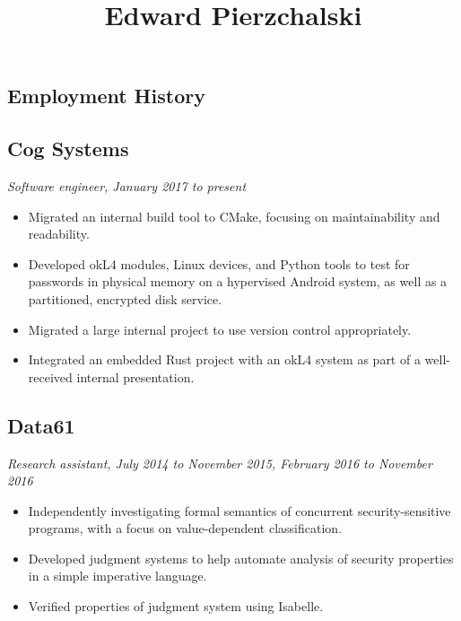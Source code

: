 \documentclass{article}
\title{Edward Pierzchalski}
\date{}
\begin{document}
\maketitle
\vspace{-5em}

\begin{multicols*}{2}

\section*{Employment History}

\subsection*{Cog Systems}
\textit{Software engineer, January 2017 to present}

\begin{itemize}[leftmargin=12pt, itemsep=-2pt, topsep=-4pt]
 \item {
  Migrated an internal build tool to CMake, focusing on maintainability and readability.
 }
 \item {
  Developed okL4 modules, Linux devices, and Python tools to test for passwords in physical memory on a hypervised Android system, as well as a partitioned, encrypted disk service.
 }
 \item {
  Migrated a large internal project to use version control appropriately.
 }
 \item {
  Integrated an embedded Rust project with an okL4 system as part of a well-received internal presentation.
 }
\end{itemize}

\subsection*{Data61}
\textit{Research assistant, July 2014 to November 2015, February 2016 to November 2016}

\begin{itemize}[leftmargin=12pt, itemsep=-2pt, topsep=-4pt]
 \item {
  Independently investigating formal semantics of concurrent security-sensitive programs, with a focus on value-dependent classification.
 }
 \item {
  Developed judgment systems to help automate analysis of security properties in a simple imperative language.
 }
 \item {
  Verified properties of judgment system using Isabelle.
 }
\end{itemize}


\end{multicols*}
\end{document}
